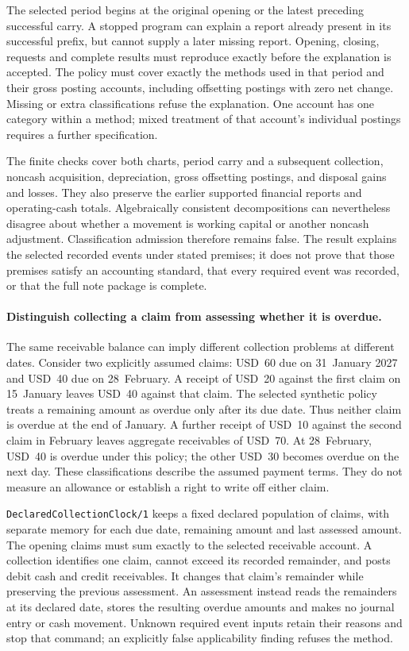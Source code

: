 The selected period begins at the original opening or the latest preceding
successful carry. A stopped program can explain a report already present in
its successful prefix, but cannot supply a later missing report. Opening,
closing, requests and complete results must reproduce exactly before the
explanation is accepted. The policy must cover exactly the methods used in
that period and their gross posting accounts, including offsetting postings
with zero net change. Missing or extra classifications refuse the explanation.
One account has one category within a method; mixed treatment of that account's
individual postings requires a further specification.

The finite checks cover both charts, period carry and a subsequent collection,
noncash acquisition, depreciation, gross offsetting postings, and disposal gains
and losses. They also preserve the earlier supported financial reports and
operating-cash totals. Algebraically consistent decompositions can nevertheless
disagree about whether a movement is working capital or another noncash
adjustment. Classification admission therefore remains false. The result
explains the selected recorded events under stated premises; it does not prove
that those premises satisfy an accounting standard, that every required event
was recorded, or that the full note package is complete.


\paragraph{Distinguish collecting a claim from assessing whether it is overdue.}
The same receivable balance can imply different collection problems at different
dates. Consider two explicitly assumed claims: USD~60 due on 31~January 2027
and USD~40 due on 28~February. A receipt of USD~20 against the first claim on
15~January leaves USD~40 against that claim. The selected synthetic policy treats
a remaining amount as overdue only after its due date. Thus neither claim is
overdue at the end of January. A further receipt of USD~10 against the second
claim in February leaves aggregate receivables of USD~70. At 28~February, USD~40
is overdue under this policy; the other USD~30 becomes overdue on the next day.
These classifications describe the assumed payment terms. They do not measure
an allowance or establish a right to write off either claim.

\texttt{DeclaredCollectionClock/1} keeps a fixed declared population of claims,
with separate memory for each due date, remaining amount and last assessed
amount. The opening claims must sum exactly to the selected receivable account.
A collection identifies one claim, cannot exceed its recorded remainder, and
posts debit cash and credit receivables. It changes that claim's remainder while
preserving the previous assessment. An assessment instead reads the remainders
at its declared date, stores the resulting overdue amounts and makes no journal
entry or cash movement. Unknown required event inputs retain their reasons and
stop that command; an explicitly false applicability finding refuses the method.

